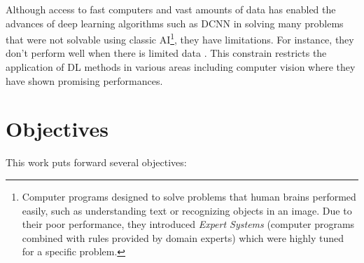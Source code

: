 Although access to fast computers and vast amounts of data has enabled the advances of deep learning algorithms such as DCNN in solving many problems that were not solvable using classic AI\footnote{Computer programs designed to solve problems that human brains performed easily, such as understanding text or recognizing objects in an image. Due to their poor performance, they introduced \textit{Expert Systems} (computer programs combined with rules provided by domain experts) which were highly tuned for a specific problem. }, they have limitations. For instance, they don't perform well when there is limited data \cite{griffin2007caltech}. This constrain restricts the application of DL methods in various areas including computer vision where they have shown promising performances.  

\newpage
\section{Objectives}
This work puts forward several objectives:
